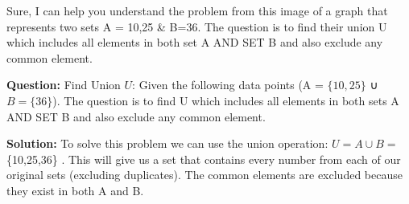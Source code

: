 Sure, I can help you understand the problem from this image of a graph that represents two sets A = {10,25} & B={36}. The question is to find their union U which includes all elements in both set A AND SET B and also exclude any common element. 

\textbf{Question:} Find Union $U$: Given the following data points (A = $\{10,25\}$ ∪  $B = \{36 \}$). The question is to find U which includes all elements in both sets A AND SET B and also exclude any common element. 

\textbf{Solution:} To solve this problem we can use the union operation: $U=A \cup B = $\{10,25,36\} . This will give us a set that contains every number from each of our original sets (excluding duplicates). The common elements are excluded because they exist in both A and B.
